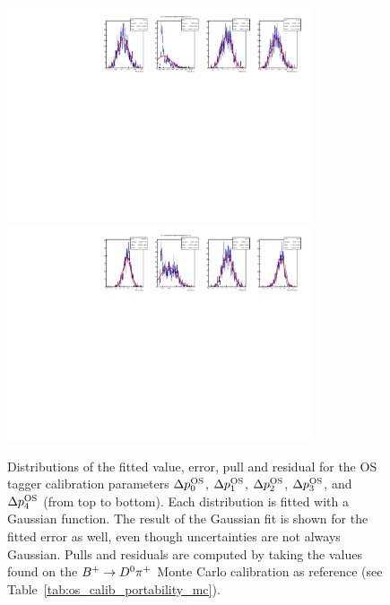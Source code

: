 \begin{figure}[t]
\begin{center}
    \includegraphics[width=0.8\textwidth]{AA-Appdx-mcbootstrap/figs/1DPullPlot_dp_3_RLogisticCalibration_MCTruth_Bu2D0Pi_OS_20171114_SSbarAccAsymmFTFloatDMGammaConstrAllSamples.pdf} \\
    \includegraphics[width=0.8\textwidth]{AA-Appdx-mcbootstrap/figs/1DPullPlot_dp_4_RLogisticCalibration_MCTruth_Bu2D0Pi_OS_20171114_SSbarAccAsymmFTFloatDMGammaConstrAllSamples.pdf} \\
    \end{center}
  \vspace{-2mm}
\caption{Distributions of the fitted value, error, pull and residual for the OS tagger calibration parameters $\Delta p_0^{\rm OS}$, $\Delta p_1^{\rm OS}$, $\Delta p_2^{\rm OS}$, $\Delta p_3^{\rm OS}$, and $\Delta p_4^{\rm OS}$ (from top to bottom). Each distribution is fitted with a Gaussian function. The result of the Gaussian fit is shown for the fitted error as well, even though uncertainties are not always Gaussian. Pulls and residuals are computed by taking the values found on the $B^+\rightarrow D^0\pi^+$ Monte Carlo calibration as reference (see Table~\ref{tab:os_calib_portability_mc}).}
  \label{fig:mc_bootstrap_deltaos}
\end{figure}
